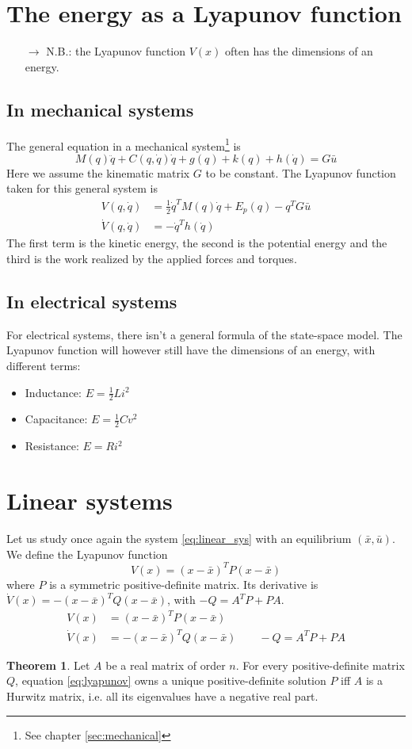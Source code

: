\documentclass[12pt, openany]{report}
\theoremstyle{definition}
\newtheorem{thm}{Theorem}[chapter]
\begin{document}
\section{The energy as a Lyapunov function}
\begin{itemize}
    \item [\(\rightarrow\)] N.B.: the Lyapunov function \(V(x)\) often has the dimensions of an energy. 
\end{itemize}
\subsection{In mechanical systems}
The general equation in a mechanical system\footnote{See chapter \ref{sec:mechanical}} is 
\begin{equation}
    M(q)\ddot q + C(q,\dot q)\dot q+g(q)+k(q)+h(\dot q)=G\bar u
\end{equation}
Here we assume the kinematic matrix \(G\) to be constant. The Lyapunov function taken for this general system is 
\begin{align}
    V(q,\dot q) &= \frac{1}{2}\dot q^TM(q)\dot q+E_p(q)-q^TG\bar u\\
    \dot V(q,\dot q) &= -\dot q^Th(\dot q)
\end{align}
The first term is the kinetic energy, the second is the potential energy and the third is the work realized by the applied forces and torques.
\subsection{In electrical systems}
For electrical systems, there isn't a general formula of the state-space model. The Lyapunov function will however still have the dimensions of an energy, with different terms:
\begin{itemize}
    \item Inductance: \(E = \frac{1}{2}Li^2\)
    \item Capacitance: \(E = \frac{1}{2}Cv^2\)
    \item Resistance: \(E = Ri^2\)
\end{itemize}
\section{Linear systems}
Let us study once again the system \eqref{eq:linear_sys} with an equilibrium \((\bar x,\bar u)\). We define the Lyapunov function \[V(x) = (x-\bar x)^TP(x-\bar x)\] where \(P\) is a symmetric positive-definite matrix. Its derivative is \(\dot V(x) = -(x-\bar x)^TQ(x-\bar x)\), with \(-Q=A^TP+PA\). 
\begin{align}
    V(x) &= (x-\bar x)^TP(x-\bar x)\\
    \dot V(x) &= -(x-\bar x)^TQ(x-\bar x)\qquad -Q = A^TP+PA \label{eq:lyapunov}
\end{align}
\begin{thm}
    Let \(A\) be a real matrix of order \(n\). For every positive-definite matrix \(Q\), equation \eqref{eq:lyapunov} owns a unique positive-definite solution \(P\) iff \(A\) is a Hurwitz matrix, i.e. all its eigenvalues have a negative real part.
\end{thm}
\end{document}
